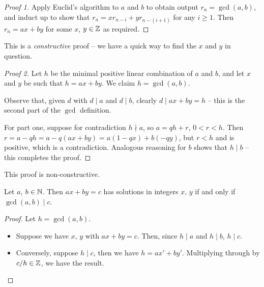 \documentclass{../../template/note}
\begin{document}
    \begin{proof}[Proof 1]
        Apply Euclid's algorithm to \(a\) and \(b\) to obtain output \(r_n = \gcd(a, b)\), and induct up to show that \(r_n = xr_{n-i} + yr_{n-(i+1)}\) for any \(i \geq 1\). Then \(r_n = ax + by\) for some \(x\), \(y \in \mathbb Z\) as required.
    \end{proof}
    
    \begin{remark*}
        This is a \emph{constructive} proof -- we have a quick way to find the \(x\) and \(y\) in question.
    \end{remark*}
    
    \begin{proof}[Proof 2]
        Let \(h\) be the minimal positive linear combination of \(a\) and \(b\), and let \(x\) and \(y\) be such that \(h=ax+by\). We claim \(h = \gcd(a, b)\).

        Observe that, given \(d\) with \(d \mid a\) and \(d \mid b\), clearly \(d \mid ax + by = h\) -- this is the second part of the \(\gcd\) definition.

        For part one, suppose for contradiction \(h \nmid a\), so \(a = qh + r\), \(0 < r < h\). Then \(r = a - qh = a - q(ax + by) = a(1-qx) +b(-qy)\), but \(r < h\) and is positive, which is a contradiction. Analogous reasoning for \(b\) shows that \(h \mid b\) -- this completes the proof.
    \end{proof}
    
    \begin{remark*}
        This proof is non-constructive.
    \end{remark*}
    
    \begin{corollary}
        Let \(a\), \(b \in \mathbb N\). Then \(ax + by = c\) has solutions in integers \(x\), \(y\) if and only if \(\gcd(a, b) \mid c\).
    \end{corollary}
    
    \begin{proof}
        Let \(h = \gcd(a, b)\).
        \begin{itemize}
            \item[\(\implies\)] Suppose we have \(x\), \(y\) with \(ax + by = c\). Then, since \(h \mid a\) and \(h \mid b\), \(h \mid c\).
            \item[\(\impliedby\)] Conversely, suppose \(h \mid c\), then we have \(h = ax' + by'\). Multiplying through by \(c/h \in \mathbb Z\), we have the result.
        \end{itemize}        
    \end{proof}
    
\end{document}
